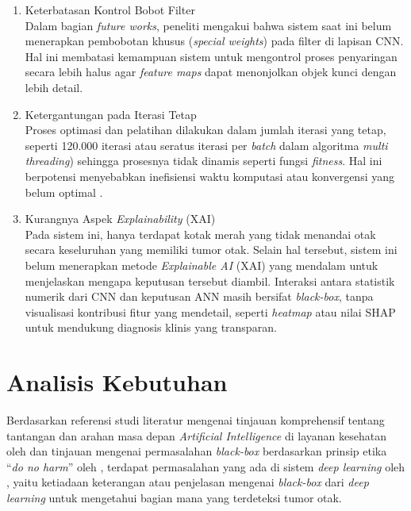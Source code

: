 \begin{enumerate}
	\item Keterbatasan Kontrol Bobot Filter\\
	Dalam bagian \textit{future works}, peneliti mengakui bahwa sistem saat ini belum menerapkan pembobotan khusus (\textit{special weights}) pada filter di lapisan CNN. Hal ini membatasi kemampuan sistem untuk mengontrol proses penyaringan secara lebih halus agar \textit{feature maps} dapat menonjolkan objek kunci dengan lebih detail.
	\item Ketergantungan pada Iterasi Tetap\\
	Proses optimasi dan pelatihan dilakukan dalam jumlah iterasi yang tetap, seperti 120.000 iterasi atau seratus iterasi per \textit{batch} dalam algoritma \textit{multi threading}) sehingga prosesnya tidak dinamis seperti fungsi \textit{fitness}. Hal ini berpotensi menyebabkan inefisiensi waktu komputasi atau konvergensi yang belum optimal \cite{wozniak2021deep}.
	\item Kurangnya Aspek \textit{Explainability} (XAI)\\
	Pada sistem ini, hanya terdapat kotak merah yang tidak menandai otak secara keseluruhan yang memiliki tumor otak. Selain hal tersebut, sistem ini belum menerapkan metode \textit{Explainable AI} (XAI) yang mendalam untuk menjelaskan mengapa keputusan tersebut diambil. Interaksi antara statistik numerik dari CNN dan keputusan ANN masih bersifat \textit{black-box}, tanpa visualisasi kontribusi fitur yang mendetail, seperti \textit{heatmap} atau nilai SHAP untuk mendukung diagnosis klinis yang transparan. 
\end{enumerate}

\section{Analisis Kebutuhan}
Berdasarkan referensi studi literatur mengenai tinjauan komprehensif tentang tantangan dan arahan masa depan \textit{Artificial Intelligence} di layanan kesehatan oleh \textcite{ennab2024enhancing} dan tinjauan mengenai permasalahan \textit{black-box} berdasarkan prinsip etika ``\textit{do no harm}'' oleh \textcite{xu2023medical}, terdapat permasalahan yang ada di sistem \textit{deep learning} oleh \textcite{wozniak2021deep}, yaitu ketiadaan keterangan atau penjelasan mengenai \textit{black-box} dari \textit{deep learning} untuk mengetahui bagian mana yang terdeteksi tumor otak.

